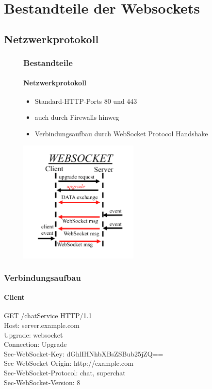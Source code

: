\documentclass{beamer}
\begin{document}
\section{Bestandteile der Websockets}

\subsection{Netzwerkprotokoll}
\begin{frame}
\begin{figure}[htbp]
\frametitle{Bestandteile}
\framesubtitle{Netzwerkprotokoll}
\begin{minipage}[t]{5cm}
\vspace{0pt}
\begin{itemize}
\item Standard-HTTP-Ports 80 und 443
\item auch durch Firewalls hinweg
\item Verbindungsaufbau durch WebSocket Protocol Handshake
\end{itemize}
\end{minipage}
\hfill
\begin{minipage}[t]{6cm}
\vspace{0pt}
\includegraphics[width=6cm]{WebSocket.png}
\end{minipage}
\end{figure}
\end{frame}

\begin{frame}
\frametitle{Verbindungsaufbau}
\framesubtitle{Client}
GET /chatService HTTP/1.1\\
Host: server.example.com\\
Upgrade: websocket\\
Connection: Upgrade\\
Sec-WebSocket-Key: dGhlIHNhbXBsZSBub25jZQ==\\
Sec-WebSocket-Origin: http://example.com\\
Sec-WebSocket-Protocol: chat, superchat\\
Sec-WebSocket-Version: 8 \\
\end{frame}
\end{document}
